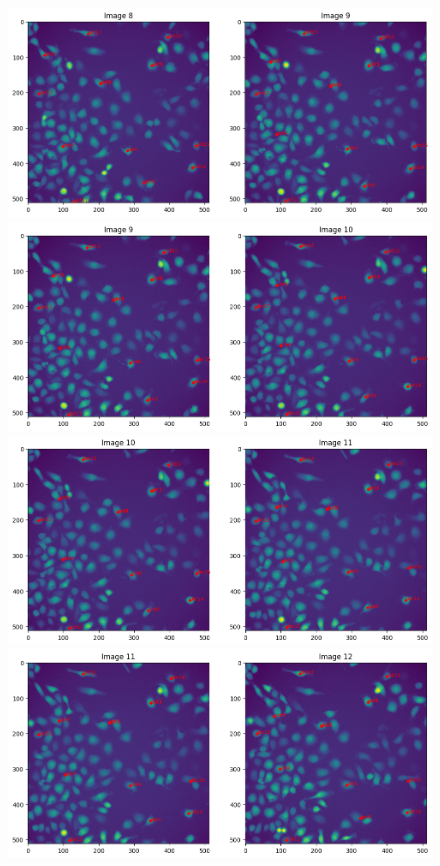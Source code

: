\documentclass{article}
\begin{document}
\begin{figure}[h!]
\centering
\includegraphics[width=0.75\linewidth]{Report/RImages/Traces_Control/image_9a.png}
\includegraphics[width=0.75\linewidth]{Report/RImages/Traces_Control/image_10a.png}
\includegraphics[width=0.75\linewidth]{Report/RImages/Traces_Control/image_11a.png}
\includegraphics[width=0.75\linewidth]{Report/RImages/Traces_Control/image_12a.png}
\end{figure}
\clearpage
\end{document}
